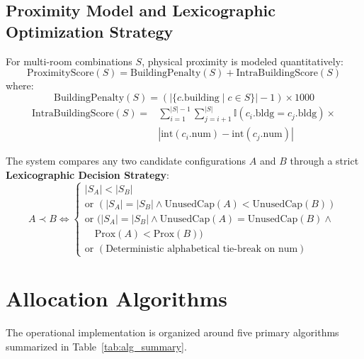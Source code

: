 \documentclass[conference]{IEEEtran}
\begin{document}
\subsection{Proximity Model and Lexicographic Optimization Strategy}
For multi-room combinations $S$, physical proximity is modeled quantitatively:
\begin{equation}
\text{ProximityScore}(S) = \text{BuildingPenalty}(S) + \text{IntraBuildingScore}(S)
\end{equation}
where:
\begin{equation}
\text{BuildingPenalty}(S) = (|\{ c.\text{building} \mid c \in S \}| - 1) \times 1000
\end{equation}
\begin{equation}
\begin{aligned}
\text{IntraBuildingScore}(S) = & \sum_{i=1}^{|S|-1} \sum_{j=i+1}^{|S|} \mathbb{I}(c_i.\text{bldg} = c_j.\text{bldg}) \times \\
& |\text{int}(c_i.\text{num}) - \text{int}(c_j.\text{num})|
\end{aligned}
\end{equation}

The system compares any two candidate configurations $A$ and $B$ through a strict \textbf{Lexicographic Decision Strategy}:
\begin{equation}
A \prec B \iff \begin{cases}
|S_A| < |S_B| \\
\text{or } (|S_A| = |S_B| \land \text{UnusedCap}(A) < \text{UnusedCap}(B)) \\
\text{or } (|S_A| = |S_B| \land \text{UnusedCap}(A) = \text{UnusedCap}(B) \land \\
\quad \text{Prox}(A) < \text{Prox}(B)) \\
\text{or } (\text{Deterministic alphabetical tie-break on } \text{num})
\end{cases}
\end{equation}

\section{Allocation Algorithms}
The operational implementation is organized around five primary algorithms summarized in Table~\ref{tab:alg_summary}.
\end{document}
